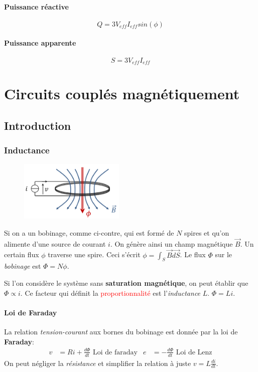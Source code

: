 \documentclass{report}
\begin{document}
\subsubsection{Puissance réactive}
\begin{equation}
Q = 3 V_{eff} I_{eff} sin(\phi)
\end{equation}

\subsubsection{Puissance apparente}
\begin{equation}
S = 3 V_{eff} I_{eff}
\end{equation}

\chapter{Circuits couplés magnétiquement}
\section{Introduction}
\subsection{Inductance}
\begin{figure}
\centering
\includegraphics[width=5cm]{img/bobinage.png}
\end{figure}
Si on a un bobinage, comme ci-contre, qui est formé de $N$ spires et qu'on alimente d'une source de courant $i$. On génère ainsi un champ magnétique $\overrightarrow{B}$. Un certain flux $\phi$ traverse une spire. Ceci s'écrit $\phi = \int_S \overrightarrow{B} \overrightarrow{dS}$. Le flux $\Phi$ sur le \textit{bobinage} est $\Phi = N \phi$.\par
Si l'on considère le système sans \textbf{saturation magnétique}, on peut établir que $\Phi \propto i$. Ce facteur qui définit la \textcolor{red}{proportionnalité} est l'\textit{inductance} $L$. $\Phi = L i$.

\subsubsection{Loi de Faraday} 
La relation \textit{tension-courant} aux bornes du bobinage est donnée par la loi de \textbf{Faraday}:
\begin{align*}
v &= Ri + \frac{d\Phi}{dt} \text{ Loi de faraday} & e &= - \frac{d \Phi}{dt} \text{ Loi de Lenz}
\end{align*}
On peut négliger la \textit{résistance} et simplifier la relation à juste $v = L \frac{di}{dt}$.
\end{document}
